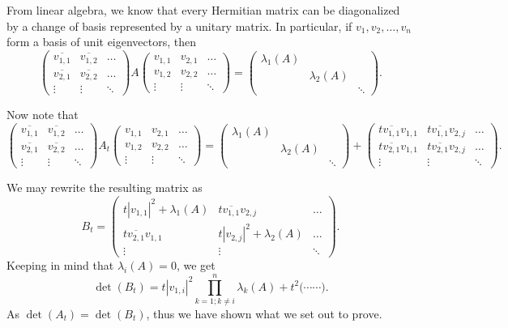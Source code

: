 \documentclass[12pt, a4paper]{article}
\renewcommand{\l}{\lambda}
\begin{document}
From linear algebra, we know that every Hermitian matrix can be diagonalized by a change of basis represented by a unitary matrix. In particular, if $v_1, v_2, \dots, v_n$ form a basis of unit eigenvectors, then
\[
    \begin{pmatrix}
        \overline{v_{1,1}}   & \overline{v_{1,2}} & \dots\\
        \overline{v_{2,1}}   & \overline{v_{2,2}} & \dots\\
        \vdots      & \vdots    & \ddots
    \end{pmatrix}
    A
    \begin{pmatrix}
        v_{1,1} & v_{2,1} & \dots\\
        v_{1,2} & v_{2,2} & \dots\\
        \vdots      & \vdots    & \ddots
    \end{pmatrix}
    =
    \begin{pmatrix}
        \l_1(A) & & \\
        & \l_2(A) & \\
        & & \ddots
    \end{pmatrix}.
\]

Now note that
\[
    \begin{pmatrix}
        \overline{v_{1,1}}   & \overline{v_{1,2}} & \dots\\
        \overline{v_{2,1}}   & \overline{v_{2,2}} & \dots\\
        \vdots      & \vdots    & \ddots
    \end{pmatrix}
    A_t
    \begin{pmatrix}
        v_{1,1} & v_{2,1} & \dots\\
        v_{1,2} & v_{2,2} & \dots\\
        \vdots      & \vdots    & \ddots
    \end{pmatrix}
    =
    \begin{pmatrix}
        \l_1(A) & & \\
        & \l_2(A) & \\
        & & \ddots
    \end{pmatrix}
    +
    \begin{pmatrix}
        t\overline{v_{1,1}}v_{1,1}   & t\overline{v_{1,1}}v_{2,j} & \dots\\
        t\overline{v_{2,1}}v_{1,1}   & t\overline{v_{2,1}}v_{2,j} & \dots\\
        \vdots                  & \vdots                & \ddots
    \end{pmatrix}.
\]

We may rewrite the resulting matrix as
\[
    B_t = 
    \begin{pmatrix}
        t|v_{1,1}|^2 + \l_1(A)   & t\overline{v_{1,1}}v_{2,j} & \dots\\
        t\overline{v_{2,1}}v_{1,1}   & t|v_{2,j}|^2 + \l_2(A) & \dots\\
        \vdots                  & \vdots                & \ddots
    \end{pmatrix}.
\]
Keeping in mind that $\l_i(A) = 0$, we get
\[
    \det(B_t) = t|v_{1,i}|^2 \prod_{k = 1; k \neq i}^n \l_k(A)
    + t^2\Big( \cdots \cdots \Big).
\]
As $\det(A_t) = \det(B_t)$, thus we have shown what we set out to prove.
    
\end{document}
